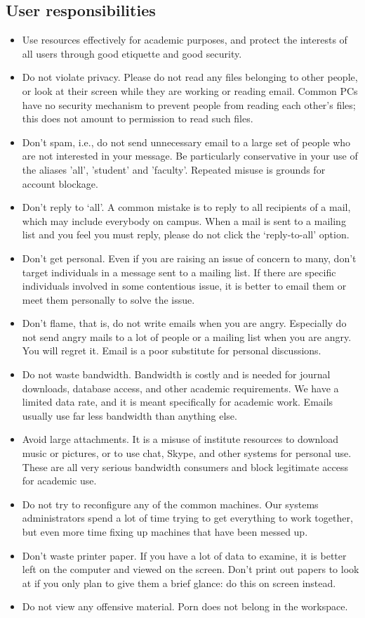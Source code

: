 \documentclass[a4paper]{extarticle}
\begin{document}
\subsection{User responsibilities}
\begin{itemize}
    \item Use resources effectively for academic purposes, and protect the
interests of all users through good etiquette and good security.
    \item Do not violate privacy. Please do not read any files belonging to other people, or look at
their screen while they are working or reading email. Common PCs have no security
mechanism to prevent people from reading each other's files; this does not amount to
permission to read such files.
    \item Don't spam, i.e., do not send unnecessary email to a large set of people who are not
interested in your message. Be particularly conservative in your use of the aliases 'all',
'student' and 'faculty'. Repeated misuse is grounds for account blockage.
    \item Don’t reply to ‘all’. A common mistake is to reply to all recipients of a mail, which may
include everybody on campus. When a mail is sent to a mailing list and you feel you must
reply, please do not click the ‘reply-to-all’ option.
    \item Don’t get personal. Even if you are raising an issue of concern to many, don't target
individuals in a message sent to a mailing list. If there are specific individuals involved in
some contentious issue, it is better to email them or meet them personally to solve the issue.
    \item Don't flame, that is, do not write emails when you are angry. Especially do not send angry
mails to a lot of people or a mailing list when you are angry. You will regret it. Email is a
poor substitute for personal discussions.
    \item Do not waste bandwidth. Bandwidth is costly and is needed for journal downloads, database
access, and other academic requirements. We have a limited data rate, and it is meant
specifically for academic work. Emails usually use far less bandwidth than anything else.
    \item Avoid large attachments. It is a misuse of institute resources to download music or pictures,
or to use chat, Skype, and other systems for personal use. These are all very serious
bandwidth consumers and block legitimate access for academic use.
    \item Do not try to reconfigure any of the common machines. Our systems administrators spend a
lot of time trying to get everything to work together, but even more time fixing up machines
that have been messed up.
    \item Don't waste printer paper. If you have a lot of data to examine, it is better left on the
computer and viewed on the screen. Don’t print out papers to look at if you only plan to give
them a brief glance: do this on screen instead.
    \item Do not view any offensive material. Porn does not belong in the workspace.
\end{itemize}
\end{document}
